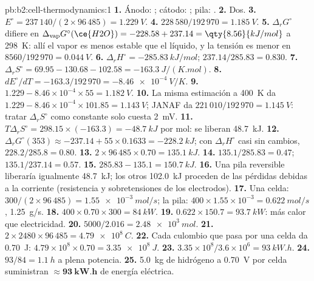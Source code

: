 \begin{solution}{pb:b2:cell-thermodynamics:1}
\textbf{1.} Ánodo: ; cátodo: ;
pila: .
\textbf{2.} Dos.
\textbf{3.} $E^\circ = 237\,140/(2 \times 96\,485) = \qty{1.229}{V}$.
\textbf{4.} $228\,580/192\,970 = \qty{1.185}{V}$.
\textbf{5.} $\Delta_r G^\circ$ difiere en $\Delta_{\text{vap}}G^\circ(\ce{H2O}) = -228.58 + 237.14 =
\qty{8.56}{kJ/mol}$ a \qty{298}{K}: allí el vapor es menos estable que el líquido, y la
tensión es menor en $8560/192\,970 = \qty{0.044}{V}$.
\textbf{6.} $\Delta_r H^\circ = \qty{-285.83}{kJ/mol}$; $237.14/285.83 = 0.830$.
\textbf{7.} $\Delta_r S^\circ = 69.95 - 130.68 - 102.58 = \qty{-163.3}{J/(K.mol)}$.
\textbf{8.} $dE^\circ/dT = -163.3/192\,970 = \qty{-8.46e-4}{V/K}$.
\textbf{9.} $1.229 - 8.46 \times 10^{-4} \times 55 = \qty{1.182}{V}$.
\textbf{10.} La misma estimación a \qty{400}{K} da $1.229 - 8.46 \times 10^{-4}
\times 101.85 = \qty{1.143}{V}$; JANAF da $221\,010/192\,970 = \qty{1.145}{V}$:
tratar $\Delta_r S^\circ$ como constante solo cuesta \qty{2}{mV}.
\textbf{11.} $T\Delta_r S^\circ = 298.15 \times (-163.3) = \qty{-48.7}{kJ}$ por mol:
se liberan \qty{48.7}{kJ}.
\textbf{12.} $\Delta_r G^\circ(353) \approx -237.14 + 55 \times 0.1633 =
\qty{-228.2}{kJ}$; con $\Delta_r H^\circ$ casi sin cambios, $228.2/285.8 = 0.80$.
\textbf{13.} $2 \times 96\,485 \times 0.70 = \qty{135.1}{kJ}$.
\textbf{14.} $135.1/285.83 = 0.47$; $135.1/237.14 = 0.57$.
\textbf{15.} $285.83 - 135.1 = \qty{150.7}{kJ}$.
\textbf{16.} Una pila reversible liberaría igualmente \qty{48.7}{kJ}; los otros
\qty{102.0}{kJ} proceden de las pérdidas debidas a la corriente (resistencia y sobretensiones
de los electrodos).
\textbf{17.} Una celda: $300/(2 \times 96\,485) = \qty{1.55e-3}{mol/s}$; la pila:
$400 \times 1.55 \times 10^{-3} = \qty{0.622}{mol/s}$, \qty{1.25}{g/s}.
\textbf{18.} $400 \times 0.70 \times 300 = \qty{84}{kW}$.
\textbf{19.} $0.622 \times 150.7 = \qty{93.7}{kW}$: más calor que electricidad.
\textbf{20.} $5000/2.016 = \qty{2.48e3}{mol}$.
\textbf{21.} $2 \times 2480 \times 96\,485 = \qty{4.79e8}{C}$.
\textbf{22.} Cada culombio que pasa por una celda da \qty{0.70}{J}: $4.79 \times
10^8 \times 0.70 = \qty{3.35e8}{J}$.
\textbf{23.} $3.35 \times 10^8/3.6 \times 10^6 = \qty{93}{kW.h}$.
\textbf{24.} $93/84 = \qty{1.1}{h}$ a plena potencia.
\textbf{25.} \qty{5.0}{kg} de hidrógeno a \qty{0.70}{V} por celda suministran
$\boldsymbol{\approx \qty{93}{kW.h}}$ de energía eléctrica.
\end{solution}
